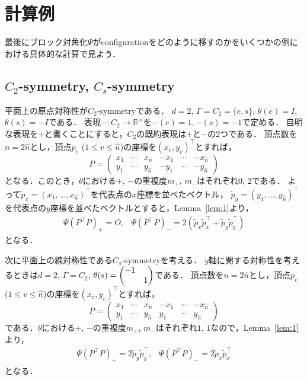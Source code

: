 \documentclass[11pt]{article}
\theoremstyle{definition}
\begin{document}
\section{計算例}
    最後にブロック対角化$\Psi$がconfigurationをどのように移すのかをいくつかの例における具体的な計算で見よう．
\subsection{$C_2$-symmetry, $C_s$-symmetry}
    平面上の原点対称性が$C_2$-symmetryである．
    $d=2$, $\Gamma=C_2=\{e,s\}$, $\theta(e)=I$, $\theta(s)=-I$である．
    表現$-:C_2 \rightarrow \mathbb{R}^\times$を$-(e)=1, -(s)=-1$で定める．
    自明な表現を$+$と書くことにすると，$C_2$の既約表現は$+$と$-$の2つである．
    頂点数を$n=2\hat{n}$とし，頂点$p_v$ ($1\leq v \leq \hat{n}$)の座標を$(x_v, y_v)^\top$とすれば，
    \[
        P=\begin{pmatrix} x_1 & \cdots & x_{\hat{n}} & -x_1 & \cdots & -x_{\hat{n}} \\ y_1 & \cdots & y_{\hat{n}} & -y_1 & \cdots & -y_{\hat{n}} \end{pmatrix}
    \]
    となる．このとき，$\theta$における$+$, $-$の重複度$m_+$, $m_-$はそれぞれ$0$, $2$である．
    よって$\tilde{p}_x = (x_1, \ldots, x_{\hat{n}})^\top$を代表点の$x$座標を並べたベクトル，
    $\tilde{p}_y = (y_1, \ldots, y_{\hat{n}})^\top$を代表点の$y$座標を並べたベクトルとすると，Lemma~\ref{lem:1}より，
    \[
        \begin{array}{ll}
        \Psi(P^\top P)_+ = O, & \Psi(P^\top P)_- = 2 (\tilde{p}_x \tilde{p}_x^\top + \tilde{p}_y \tilde{p}_y^\top)
        \end{array}
    \]
    となる．

    次に平面上の線対称性である$C_s$-symmetryを考える．
    $y$軸に関する対称性を考えるときは$d=2$, $\Gamma=C_2$, $\theta(s)=\mqty(\dmat{-1,1})$である．
    頂点数を$n=2\hat{n}$とし，頂点$p_v$ ($1\leq v \leq \hat{n}$)の座標を$(x_v, y_v)^\top$とすれば，
    \[
        P=\begin{pmatrix} x_1 & \cdots & x_{\hat{n}} & -x_1 & \cdots & -x_{\hat{n}} \\ y_1 & \cdots & y_{\hat{n}} & y_1 & \cdots & y_{\hat{n}} \end{pmatrix}
    \]
    である．$\theta$における$+$, $-$の重複度$m_+$, $m_-$はそれぞれ$1$, $1$なので，Lemma~\ref{lem:1}より，
    \[
        \begin{array}{ll}
            \Psi(P^\top P)_+ = 2\tilde{p}_y \tilde{p}_y^\top, &
            \Psi(P^\top P)_- = 2\tilde{p}_x \tilde{p}_x^\top
        \end{array}
    \]
    となる．


\appendix
\end{document}
